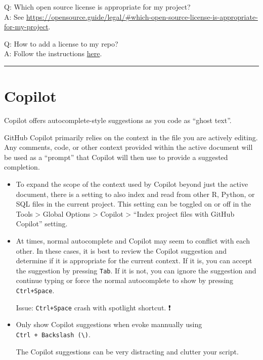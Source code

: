 \documentclass[
  a4paper,
  twoside,
  openright]{book}
\theoremstyle{definition}
\theoremstyle{definition}
\theoremstyle{definition}
\theoremstyle{definition}
\theoremstyle{remark}
\begin{document}
Q: Which open source license is appropriate for my project?\\
A: See \url{https://opensource.guide/legal/\#which-open-source-license-is-appropriate-for-my-project}.

Q: How to add a license to my repo?\\
A: Follow the instructions \href{https://docs.github.com/en/communities/setting-up-your-project-for-healthy-contributions/adding-a-license-to-a-repository}{here}.

\begin{center}\rule{0.5\linewidth}{0.5pt}\end{center}

\section{Copilot}\label{copilot}

Copilot offers autocomplete-style suggestions as you code as ``ghost text''.

GitHub Copilot primarily relies on the context in the file you are actively editing. Any comments, code, or other context provided within the active document will be used as a ``prompt'' that Copilot will then use to provide a suggested completion.

\begin{itemize}
\item
  To expand the scope of the context used by Copilot beyond just the active document, there is a setting to also index and read from other R, Python, or SQL files in the current project. This setting can be toggled on or off in the Tools \textgreater{} Global Options \textgreater{} Copilot \textgreater{} ``Index project files with GitHub Copilot'' setting.
\item
  At times, normal autocomplete and Copilot may seem to conflict with each other. In these cases, it is best to review the Copilot suggestion and determine if it is appropriate for the current context. If it is, you can accept the suggestion by pressing \texttt{Tab}. If it is not, you can ignore the suggestion and continue typing or force the normal autocomplete to show by pressing \texttt{Ctrl+Space}.

  Issue: \texttt{Ctrl+Space} crash with spotlight shortcut. ❗️
\item
  Only show Copilot suggestions when evoke mannually using \texttt{Ctrl\ +\ Backslash\ (\textbackslash{})}.

  The Copilot suggestions can be very distracting and clutter your script.
\end{itemize}
\end{document}
